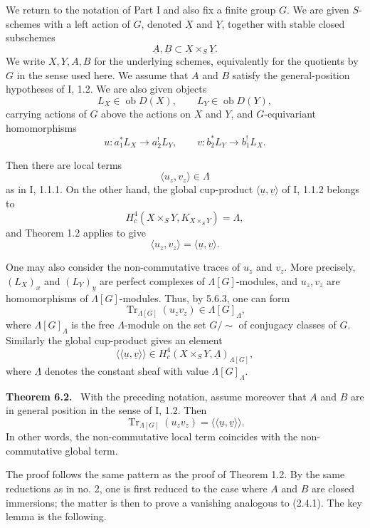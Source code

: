 \documentclass[12pt]{article}
\newcommand{\Tr}{\operatorname{Tr}}
\newcommand{\ob}{\operatorname{ob}}
\newenvironment{statement}[1]{\par\medskip\noindent\textbf{#1.}\ }{\par\medskip}
\begin{document}
We return to the notation of Part I and also fix a finite group $G$. We are given
$S$-schemes with a left action of $G$, denoted $\underline X$ and
$\underline Y$, together with stable closed subschemes
\[
  \underline A,\underline B\subset \underline X\times_S\underline Y.
\]
We write $X,Y,A,B$ for the underlying schemes, equivalently for the quotients by
$G$ in the sense used here. We assume that $A$ and $B$ satisfy the general-position
hypotheses of I, 1.2. We are also given objects
\[
      L_X\in\ob D(X),\qquad L_Y\in\ob D(Y),
\]
carrying actions of $G$ above the actions on $X$ and $Y$, and $G$-equivariant
homomorphisms
\[
      u:a_1^*L_X\longrightarrow a_2^!L_Y,
      \qquad
      v:b_2^*L_Y\longrightarrow b_1^!L_X.
\]

Then there are local terms
\[
      \langle u_z,v_z\rangle\in\Lambda
\]
as in I, 1.1.1. On the other hand, the global cup-product
$\langle \underline u,\underline v\rangle$ of I, 1.1.2 belongs to
\[
      H_c^4(X\times_S Y,K_{X\times_S Y})=\Lambda,
\]
and Theorem 1.2 applies to give
\[
      \langle u_z,v_z\rangle=\langle \underline u,\underline v\rangle.
\]

One may also consider the non-commutative traces of $u_z$ and $v_z$. More precisely,
$(L_X)_x$ and $(L_Y)_y$ are perfect complexes of $\Lambda[G]$-modules, and
$u_z,v_z$ are homomorphisms of $\Lambda[G]$-modules. Thus, by 5.6.3, one can form
\[
       \Tr_{\Lambda[G]}(u_zv_z)\in \Lambda[G]_{\Lambda},
\]
where $\Lambda[G]_{\Lambda}$ is the free $\Lambda$-module on the set $G/\sim$ of
conjugacy classes of $G$. Similarly the global cup-product gives an element
\[
       \langle\!\langle\underline u,\underline v\rangle\!\rangle
       \in H_c^4(X\times_S Y,\underline\Lambda)_{\Lambda[G]},
\]
where $\underline\Lambda$ denotes the constant sheaf with value
$\Lambda[G]_\Lambda$.

\begin{statement}{Theorem 6.2}
With the preceding notation, assume moreover that $A$ and $B$ are in general
position in the sense of I, 1.2. Then
\[
       \Tr_{\Lambda[G]}(u_zv_z)
       =\langle\!\langle\underline u,\underline v\rangle\!\rangle .
\]
In other words, the non-commutative local term coincides with the non-commutative
global term.
\end{statement}

The proof follows the same pattern as the proof of Theorem 1.2. By the same
reductions as in no. 2, one is first reduced to the case where $A$ and $B$ are
closed immersions; the matter is then to prove a vanishing analogous to (2.4.1).
The key lemma is the following.
\end{document}
